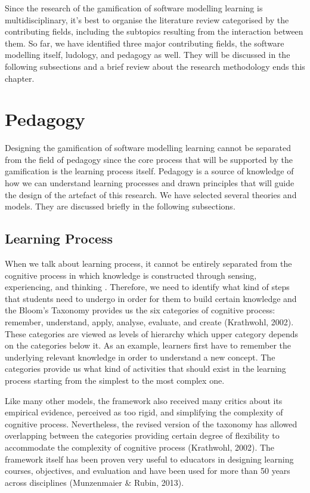 \documentclass[a4paper]{Report}
\begin{document}
Since the research of the gamification of software modelling learning is multidisciplinary, it’s best to organise the literature review categorised by the contributing fields, including the subtopics resulting from the interaction between them. So far, we have identified three major contributing fields, the software modelling itself, ludology, and pedagogy as well. They will be discussed in the following subsections and a brief review about the research methodology ends this chapter.

\section{Pedagogy}
Designing the gamification of software modelling learning cannot be separated from the field of pedagogy since the core process that will be supported by the gamification is the learning process itself. Pedagogy is a source of knowledge of how we can understand learning processes and drawn principles that will guide the design of the artefact of this research. We have selected several theories and models. They are discussed briefly in the following subsections.

\subsection{Learning Process}
When we talk about learning process, it cannot be entirely separated from the cognitive process in which knowledge is constructed through sensing, experiencing, and thinking . Therefore, we need to identify what kind of steps that students need to undergo in order for them to build certain knowledge and the Bloom’s Taxonomy provides us the six categories of cognitive process: remember, understand, apply, analyse, evaluate, and create  (Krathwohl, 2002). These categories are viewed as levels of hierarchy which upper category depends on the categories below it. As an example, learners first have to remember the underlying relevant knowledge in order to understand a new concept. The categories provide us what kind of activities that should exist in the learning process starting from the simplest to the most complex one.

Like many other models, the framework also received many critics about its empirical evidence, perceived as too rigid, and simplifying the complexity of cognitive process. Nevertheless, the revised version of the taxonomy has allowed overlapping between the categories providing certain degree of flexibility to accommodate the complexity  of cognitive process (Krathwohl, 2002). The framework itself has been proven very useful to educators in designing learning courses, objectives, and evaluation and have been used for more than 50 years across disciplines (Munzenmaier \& Rubin, 2013). 
\end{document}
